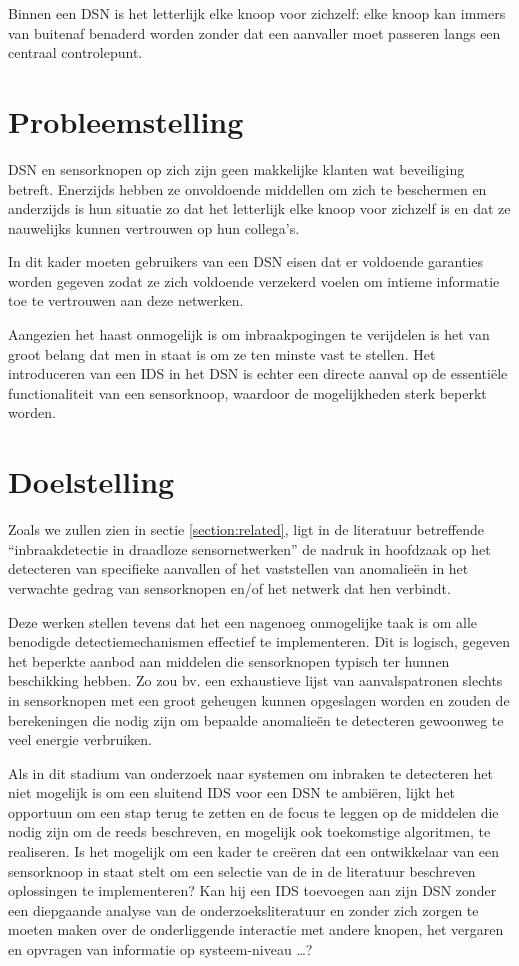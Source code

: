 Binnen een DSN is het letterlijk elke knoop voor zichzelf: elke knoop kan
immers van buitenaf benaderd worden zonder dat een aanvaller moet passeren
langs een centraal controlepunt.

\section{Probleemstelling}
\label{section:probleem}

DSN en sensorknopen op zich zijn geen makkelijke klanten wat beveiliging
betreft. Enerzijds hebben ze onvoldoende middellen om zich te beschermen en
anderzijds is hun situatie zo dat het letterlijk elke knoop voor zichzelf is en
dat ze nauwelijks kunnen vertrouwen op hun collega's.

In dit kader moeten gebruikers van een DSN eisen dat er voldoende garanties
worden gegeven zodat ze zich voldoende verzekerd voelen om intieme informatie
toe te vertrouwen aan deze netwerken.

Aangezien het haast onmogelijk is om inbraakpogingen te verijdelen is het van
groot belang dat men in staat is om ze ten minste vast te stellen. Het
introduceren van een IDS in het DSN is echter een directe aanval op de
essenti\"ele functionaliteit van een sensorknoop, waardoor de mogelijkheden
sterk beperkt worden.

\section{Doelstelling}
\label{section:doelstelling}

Zoals we zullen zien in sectie \ref{section:related}, ligt in de literatuur
betreffende ``inbraakdetectie in draadloze sensornetwerken'' de nadruk in
hoofdzaak op het detecteren van specifieke aanvallen of het vaststellen van
anomalie\"en in het verwachte gedrag van sensorknopen en/of het netwerk dat hen
verbindt.

Deze werken stellen tevens dat het een nagenoeg onmogelijke taak is om alle
benodigde detectiemechanismen effectief te implementeren. Dit is logisch,
gegeven het beperkte aanbod aan middelen die sensorknopen typisch ter hunnen
beschikking hebben. Zo zou bv. een exhaustieve lijst van aanvalspatronen
slechts in sensorknopen met een groot geheugen kunnen opgeslagen worden en
zouden de berekeningen die nodig zijn om bepaalde anomalie\"en te detecteren
gewoonweg te veel energie verbruiken.

Als in dit stadium van onderzoek naar systemen om inbraken te detecteren het
niet mogelijk is om een sluitend IDS voor een DSN te ambi\"eren, lijkt het
opportuun om een stap terug te zetten en de focus te leggen op de middelen die
nodig zijn om de reeds beschreven, en mogelijk ook toekomstige algoritmen, te
realiseren. Is het mogelijk om een kader te cre\"eren dat een ontwikkelaar van
een sensorknoop in staat stelt om een selectie van de in de literatuur
beschreven oplossingen te implementeren? Kan hij een IDS toevoegen aan zijn DSN
zonder een diepgaande analyse van de onderzoeksliteratuur en zonder zich zorgen
te moeten maken over de onderliggende interactie met andere knopen, het
vergaren en opvragen van informatie op systeem-niveau \dots?

